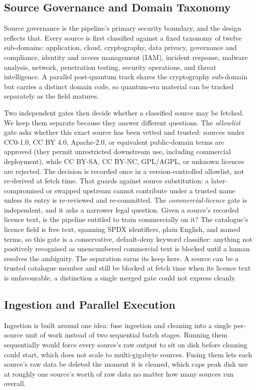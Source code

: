 \documentclass[conference]{IEEEtran}
\begin{document}
\subsection{Source Governance and Domain Taxonomy}

Source governance is the pipeline's primary security boundary, and the
design reflects that. Every source is first classified against a fixed
taxonomy of twelve sub-domains: application, cloud, cryptography, data
privacy, governance and compliance, identity and access management
(IAM), incident response, malware analysis, network, penetration
testing, security operations, and threat intelligence. A parallel
post-quantum track shares the cryptography sub-domain but carries a
distinct domain code, so quantum-era material can be tracked separately
as the field matures.

Two independent gates then decide whether a classified source may be
fetched. We keep them separate because they answer different questions.
The \emph{allowlist} gate asks whether this exact source has been vetted
and trusted: sources under CC0-1.0, CC BY 4.0, Apache-2.0, or equivalent
public-domain terms are approved (they permit unrestricted downstream
use, including commercial deployment), while CC BY-SA, CC BY-NC,
GPL/AGPL, or unknown licences are rejected. The decision is recorded
once in a version-controlled allowlist, not re-derived at fetch time.
That guards against source substitution: a later-compromised or swapped
upstream cannot contribute under a trusted name unless its entry is
re-reviewed and re-committed. The \emph{commercial-licence} gate is
independent, and it asks a narrower legal question. Given a source's
recorded licence text, is the pipeline entitled to train commercially on
it? The catalogue's licence field is free text, spanning SPDX
identifiers, plain English, and named terms, so this gate is a
conservative, default-deny keyword classifier: anything not positively
recognised as unencumbered commercial text is blocked until a human
resolves the ambiguity. The separation earns its keep here. A source can
be a trusted catalogue member and still be blocked at fetch time when
its licence text is unfavourable, a distinction a single merged gate
could not express cleanly.

\subsection{Ingestion and Parallel Execution}

Ingestion is built around one idea: fuse ingestion and cleaning into a
single per-source unit of work instead of two sequential batch stages.
Running them sequentially would force every source's raw output to sit
on disk before cleaning could start, which does not scale to
multi-gigabyte sources. Fusing them lets each source's raw data be
deleted the moment it is cleaned, which caps peak disk use at roughly
one source's worth of raw data no matter how many sources run overall.
\end{document}
